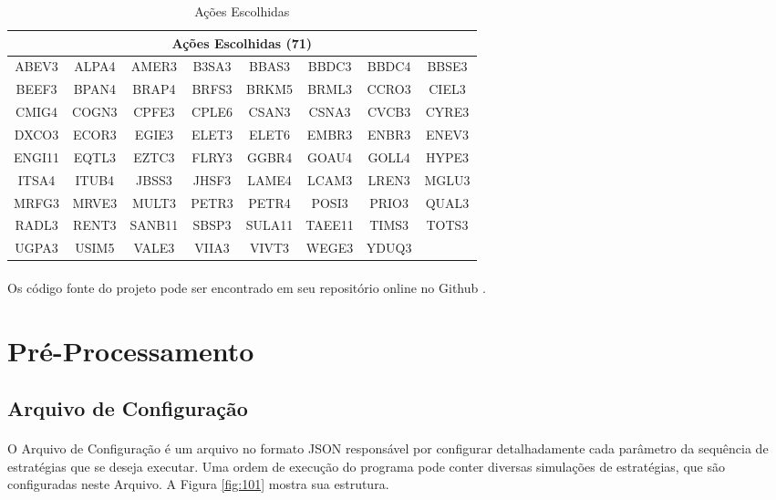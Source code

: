 \begin{table}[h!]
    \begin{center}
        \begin{tabular}{ cccccccc }
            \multicolumn{8}{c}{Ações Escolhidas (71)} \\
            \hline
            ABEV3 & ALPA4 & AMER3 & B3SA3 & BBAS3 & BBDC3 & BBDC4 & BBSE3 \\
            BEEF3 & BPAN4 & BRAP4 & BRFS3 & BRKM5 & BRML3 & CCRO3 & CIEL3 \\
            CMIG4 & COGN3 & CPFE3 & CPLE6 & CSAN3 & CSNA3 & CVCB3 & CYRE3 \\
            DXCO3 & ECOR3 & EGIE3 & ELET3 & ELET6 & EMBR3 & ENBR3 & ENEV3 \\
            ENGI11 & EQTL3 & EZTC3 & FLRY3 & GGBR4 & GOAU4 & GOLL4 & HYPE3 \\
            ITSA4 & ITUB4 & JBSS3 & JHSF3 & LAME4 & LCAM3 & LREN3 & MGLU3 \\
            MRFG3 & MRVE3 & MULT3 & PETR3 & PETR4 & POSI3 & PRIO3 & QUAL3 \\
            RADL3 & RENT3 & SANB11 & SBSP3 & SULA11 & TAEE11 & TIMS3 & TOTS3 \\
            UGPA3 & USIM5 & VALE3 & VIIA3 & VIVT3 & WEGE3 & YDUQ3
        \end{tabular}
        \caption{Ações Escolhidas}
        \label{tab:5}
    \end{center}
\end{table}

\paragraph{} Os código fonte do projeto pode ser encontrado em seu repositório online no Github \cite{project_github}.


\FloatBarrier
\section{Pré-Processamento}

\FloatBarrier
\subsection{Arquivo de Configuração}
\label{sub:conf_file}

\paragraph{} O Arquivo de Configuração é um arquivo no formato JSON responsável por configurar detalhadamente cada parâmetro da sequência de estratégias que se deseja executar. Uma ordem de execução do programa pode conter diversas simulações de estratégias, que são configuradas neste Arquivo. A Figura \ref{fig:101} mostra sua estrutura.

